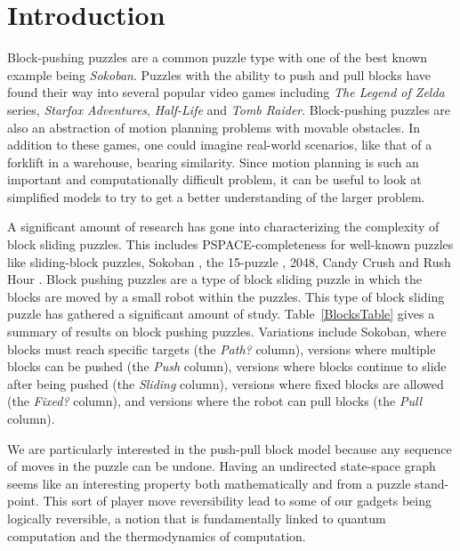 
\section{Introduction} 
Block-pushing puzzles are a common puzzle type with one of the best known example being \emph{Sokoban}. Puzzles with the ability to push and pull blocks have found their way into several popular video games including \emph{The Legend of Zelda} series, \emph{Starfox Adventures}, \emph{Half-Life} and \emph{Tomb Raider}. Block-pushing puzzles are also an abstraction of motion planning problems with movable obstacles. In addition to these games, one could imagine real-world scenarios, like that of a forklift in a warehouse, bearing similarity. Since motion planning is such an important and computationally difficult problem, it can be useful to look at simplified models to try to get a better understanding of the larger problem.

A significant amount of research has gone into characterizing the complexity of block sliding puzzles. This includes PSPACE-completeness for well-known puzzles like sliding-block puzzles\cite{hearn2005pspace}, Sokoban \cite{Sokoban98, DZ96}, the 15-puzzle \cite{15Puzzle}, 2048\cite{abdelkader2048}, Candy Crush\cite{guala2014bejeweled} and Rush Hour \cite{RushHour02}. Block pushing puzzles are a type of block sliding puzzle in which the blocks are moved by a small robot within the puzzles. This type of block sliding puzzle has gathered a significant amount of study. Table~\ref{BlocksTable} gives a summary of results on block pushing puzzles. Variations include Sokoban\cite{Sokoban98, DZ96}, where blocks must reach specific targets (the \emph{Path?} column), versions where multiple blocks can be pushed\cite{Push100, Push*00, Push2F02, DZ96, Sokoban98, Pull10} (the \emph{Push} column), versions where blocks continue to slide after being pushed\cite{PushPushk04, Push*00} (the \emph{Sliding} column), versions where fixed blocks are allowed\cite{DO92, Push2F02} (the \emph{Fixed?} column), and versions where the robot can pull blocks\cite{Pull10} (the \emph{Pull} column). 

We are particularly interested in the push-pull block model because any sequence of moves in the puzzle can be undone.  Having an undirected state-space graph seems like an interesting property both mathematically and from a puzzle stand-point. This sort of player move reversibility lead to some of our gadgets being logically reversible, a notion that is fundamentally linked to quantum computation and the thermodynamics of computation. 


